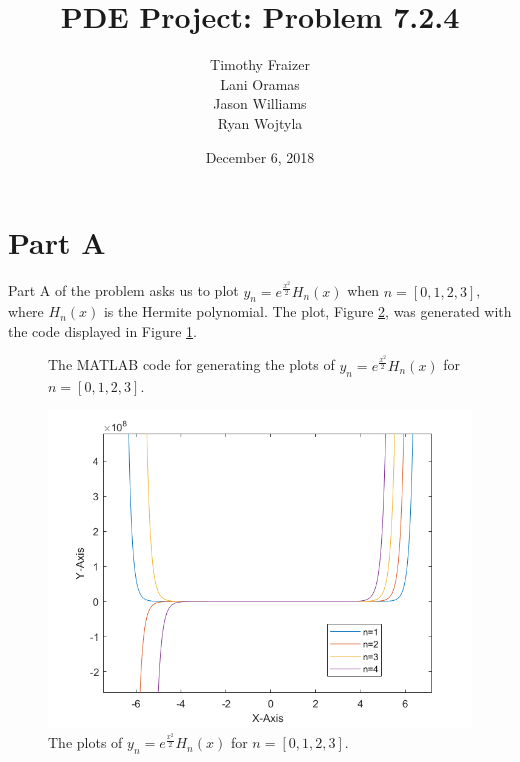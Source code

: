 \documentclass{article}
\begin{document}

\begin{titlepage}

  \title{PDE Project: Problem 7.2.4}
  \date{December 6, 2018}
  \author{Timothy Fraizer\\
          Lani Oramas\\
          Jason Williams\\
          Ryan Wojtyla\\}

  \maketitle

  \thispagestyle{empty}

\end{titlepage}



\section*{Part A}

\qq Part A of the problem asks us to plot \(y_n = e^{\frac{x^2}{2}} H_n(x)\)
when \(n = [0,1,2,3]\), where \(H_n(x)\) is the Hermite polynomial. The plot,
Figure \ref{gph:hermite}, was generated with the code displayed in Figure
\ref{cod:hermite}.

\begin{figure}[H]
  \begin{center}
    
  \end{center}
  \caption{The MATLAB code for generating the plots of \(y_n = e^{\frac{x^2}{2}}
    H_n(x)\) for \(n = [0,1,2,3]\).}
  \label{cod:hermite}
\end{figure}

\begin{figure}[H]
  \begin{center}
    \includegraphics[scale=0.7]{MATLAB2.png}
  \end{center}
  \caption{The plots of \(y_n = e^{\frac{x^2}{2}}H_n(x)\) for \(n = [0,1,2,3]\).}
  \label{gph:hermite}
\end{figure}
\end{document}
